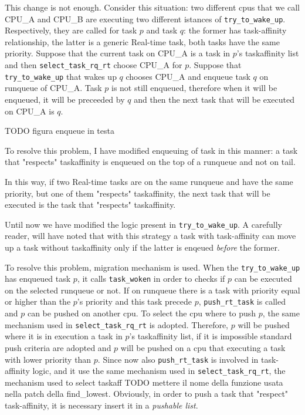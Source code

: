 This change is not enough. Consider this situation: two different cpus that we call CPU\_A and CPU\_B are executing two different istances of 
\texttt{try\_to\_wake\_up}. Respectively, they are called for task $p$ and task $q$: the former has task-affinity relationship, the latter is a generic 
Real-time task, both tasks have the same priority. Suppose that the current task on CPU\_A is a task in $p$'s taskaffinity list and then 
\texttt{select\_task\_rq\_rt} choose CPU\_A for $p$. Suppose that \texttt{try\_to\_wake\_up} that wakes up $q$ chooses CPU\_A and enqueue task $q$ on 
runqueue of CPU\_A. Task $p$ is not still enqueued, therefore when it will be enqueued, it will be preceeded by $q$ and then the next task that will
be executed on CPU\_A is $q$.

TODO figura enqueue in testa

To resolve this problem, I have modified enqueuing of task in this manner: a task that "respects" taskaffinity is enqueued on the top of a runqueue and not 
on tail. 

In this way, if two Real-time tasks are on the same runqueue and have the same priority, but one of them "respects" taskaffinity, the next task that 
will be executed is the task that "respects" taskaffinity. 

Until now we have modified the logic present in \texttt{try\_to\_wake\_up}. A carefully reader, will have noted that with this strategy a task with 
task-affinity can move up a task without taskaffinity only if the latter is enqeued \textit{before} the former.

To resolve this problem, migration mechanism is used. When the \texttt{try\_to\_wake\_up} has enqueued task $p$, it calls \texttt{task\_woken} in order to
checks if $p$ can be executed on the selected runqueue or not. If on runqueue there is a task with priority equal or higher than the $p$'s priority and 
this task precede $p$, \texttt{push\_rt\_task} is called and $p$ can be pushed on another cpu. To select the cpu where to push $p$, the same mechanism used 
in \texttt{select\_task\_rq\_rt} is adopted. Therefore, $p$ will be pushed where it is in execution a task in $p$'s taskaffinity list, if it is impossible
standard push criteria are adopted and $p$ will be pushed on a cpu that executing a task with lower priority than $p$. Since now also \texttt{push\_rt\_task}
is involved in task-affinity logic, and it use the same mechanism used in \texttt{select\_task\_rq\_rt},  the mechanism used to select taskaff TODO
mettere il nome della funzione usata nella patch della find\_lowest. Obviously, in order to push a task that "respect" task-affinity, it is necessary 
insert it in a \textit{pushable list}.  


